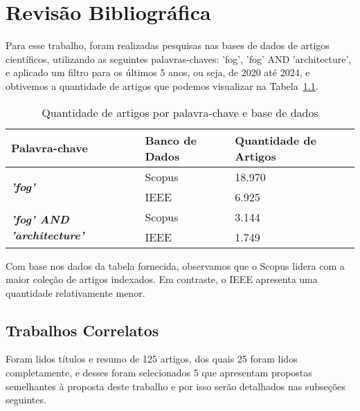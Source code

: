 \chapter{Revisão Bibliográfica}

Para esse trabalho, foram realizadas pesquisas nas bases de dados de artigos científicos, utilizando as seguintes palavras-chaves: 'fog', 'fog' AND 'architecture', e aplicado um filtro para os últimos 5 anos, ou seja, de 2020 até 2024, e obtivemos a quantidade de artigos que podemos visualizar na Tabela~\ref{tab:Tab_ArtigosFog}.

\begin{table}[htb]
	\ABNTEXfontereduzida
	\caption{\label{tab:Tab_ArtigosFog}Quantidade de artigos por palavra-chave e base de dados}
	\begin{tabular}{@{}p{6.5cm}p{3.5cm}p{4cm}@{}}
		\toprule
		\textbf{Palavra-chave} & \textbf{Banco de Dados} & \textbf{Quantidade de Artigos} \\ \midrule
		\multirow[c]{2}{*}{\textbf{\textit{'fog'}}} 
		    & Scopus & 18.970 \\
		    & IEEE   & 6.925  \\ \midrule
		\multirow[c]{2}{*}{\textbf{\textit{'fog' AND 'architecture'}}} 
		    & Scopus & 3.144 \\
		    & IEEE   & 1.749 \\ \midrule
	\end{tabular}
\end{table}

Com base nos dados da tabela fornecida, observamos que o Scopus lidera com a maior coleção de artigos indexados. Em contraste, o IEEE apresenta uma quantidade relativamente menor.

\section{Trabalhos Correlatos}\label{cap:trabalhos_relacionados}

Foram lidos títulos e resumo de 125 artigos, dos quais 25 foram lidos completamente, e desses foram selecionados 5 que apresentam propostas semelhantes à proposta deste trabalho e por isso serão detalhados nas subseções seguintes.

